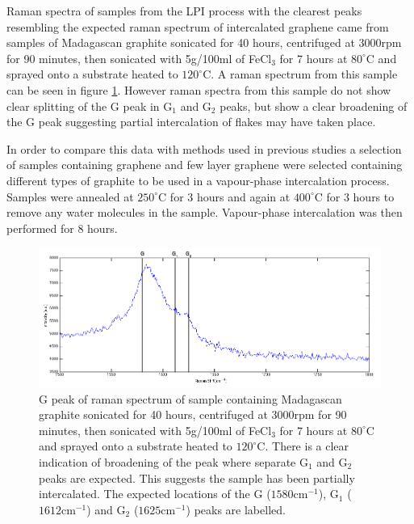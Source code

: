 \documentclass[12pt,titlepage]{article}
\begin{document}
	
	Raman spectra of samples from the LPI process with the clearest peaks resembling the expected raman spectrum of intercalated graphene came from samples of Madagascan graphite sonicated for 40 hours, centrifuged at 3000rpm for 90 minutes, then sonicated with 5g/100ml of FeCl$_3$ for 7 hours at $80^{\circ}$C and sprayed onto a substrate heated to $120^{\circ}$C. A raman spectrum from this sample can be seen in figure \ref{fig:best-interc}. However raman spectra from this sample do not show clear splitting of the G peak in G$_1$ and G$_2$ peaks, but show a clear broadening of the G peak suggesting partial intercalation of flakes may have taken place.
	
	In order to compare this data with methods used in previous studies \cite{Khrapach2012a} a selection of samples containing graphene and few layer graphene were selected containing different types of graphite to be used in a vapour-phase intercalation process. Samples were annealed at $250^{\circ}$C for 3 hours and again at $400^{\circ}$C for 3 hours to remove any water molecules in the sample. Vapour-phase intercalation was then performed for 8 hours. 
	
	\begin{figure}
		\centering
		\includegraphics[width=1\textwidth]{figures/best-interc.png}
		\caption[Clearest raman spectrum found for intercalated graphene.]{G peak of raman spectrum of sample containing Madagascan graphite sonicated for 40 hours, centrifuged at 3000rpm for 90 minutes, then sonicated with 5g/100ml of FeCl$_3$ for 7 hours at $80^{\circ}$C and sprayed onto a substrate heated to $120^{\circ}$C. There is a clear indication of broadening of the peak where separate G$_1$ and G$_2$ peaks are expected. This suggests the sample has been partially intercalated. The expected locations of the G ($1580\text{cm}^{-1}$), G$_1$ ($1612\text{cm}^{-1}$) and G$_2$ ($1625\text{cm}^{-1}$) peaks are labelled.}
		\label{fig:best-interc}
	\end{figure}
	
\end{document}
